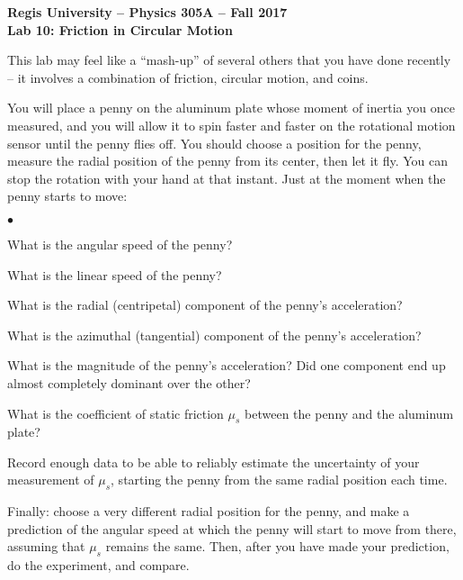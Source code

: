 \documentclass[11pt]{article}
\newcommand{\squishlist}{
   \begin{list}{$\bullet$}
    { \setlength{\itemsep}{0pt}      \setlength{\parsep}{3pt}
      \setlength{\topsep}{3pt}       \setlength{\partopsep}{0pt}
      \setlength{\leftmargin}{1.5em} \setlength{\labelwidth}{1em}
      \setlength{\labelsep}{0.5em} } }
\newcommand{\squishend}{
    \end{list}  }
\begin{document}
\begin{center}
{\bf{Regis University -- Physics 305A -- Fall 2017}} \\
{\bf{Lab 10: Friction in Circular Motion}} \\
\end{center}

This lab may feel like a ``mash-up'' of several others that you have done 
recently -- it involves a combination of friction, circular motion, and coins.

You will place a penny on the aluminum plate whose moment of inertia you 
once measured, and you will allow it to spin faster and faster 
on the rotational motion sensor until the penny flies off.  
You should choose a position for the penny, measure the radial position of 
the penny from its center, then let it fly.   You can stop the rotation with 
your hand at that instant.  Just at the moment when the penny starts to move:

\squishlist
\item What is the angular speed of the penny?
\item What is the linear speed of the penny?
\item What is the radial (centripetal) component of the penny's acceleration?
\item What is the azimuthal (tangential) component of the penny's acceleration?
\item What is the magnitude of the penny's acceleration?  Did one component
end up almost completely dominant over the other?
\item What is the coefficient of static friction $\mu_s$ between the penny and the aluminum plate?
\squishend

Record enough data to be able to reliably estimate the uncertainty 
of your measurement of $\mu_s$, starting the penny from the same radial 
position each time.

Finally: choose a very different radial position for the penny, and make a 
prediction of the angular speed at which the penny will start to move from 
there, assuming that $\mu_s$ remains the same.  Then, after you have made
your prediction, do the experiment, and compare.
\end{document}
